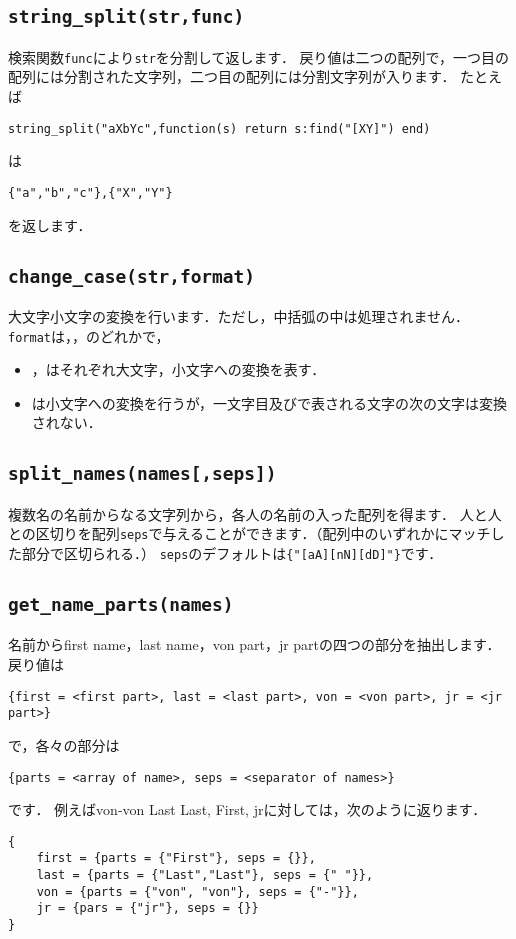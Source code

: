 \documentclass[a4paper]{ltjsarticle}
\newcommand{\luafunc}[1]{\texttt{#1}}
\newcommand*{\luavar}[1]{\texttt{#1}}
\begin{document}
\subsection{\luafunc{string\_split(str,func)}}
検索関数\luavar{func}により\luavar{str}を分割して返します．
戻り値は二つの配列で，一つ目の配列には分割された文字列，二つ目の配列には分割文字列が入ります．
たとえば
\begin{lstlisting}
string_split("aXbYc",function(s) return s:find("[XY]") end)
\end{lstlisting}
は
\begin{lstlisting}
{"a","b","c"},{"X","Y"}
\end{lstlisting}
を返します．


\subsection{\luafunc{change\_case(str,format)}}
大文字小文字の変換を行います．ただし，中括弧の中は処理されません．
\luavar{format}は，，のどれかで，
\begin{itemize}
\item {}，はそれぞれ大文字，小文字への変換を表す．
\item {}は小文字への変換を行うが，一文字目及び\luastring{: *}で表される文字の次の文字は変換されない．
\end{itemize}


\subsection{\luafunc{split\_names(names[,seps])}}
複数名の名前からなる文字列から，各人の名前の入った配列を得ます．
人と人との区切りを配列\luavar{seps}で与えることができます．（配列中のいずれかにマッチした部分で区切られる．）
\luavar{seps}のデフォルトは\verb|{"[aA][nN][dD]"}|です．

\subsection{\luafunc{get\_name\_parts(names)}}
名前からfirst name，last name，von part，jr partの四つの部分を抽出します．
戻り値は
\begin{lstlisting}
{first = <first part>, last = <last part>, von = <von part>, jr = <jr part>}
\end{lstlisting}
で，各々の部分は
\begin{lstlisting}
{parts = <array of name>, seps = <separator of names>}
\end{lstlisting}
です．%
例えばvon-von Last Last, First, jrに対しては，次のように返ります．
\begin{lstlisting}
{
	first = {parts = {"First"}, seps = {}},
	last = {parts = {"Last","Last"}, seps = {" "}},
	von = {parts = {"von", "von"}, seps = {"-"}},
	jr = {pars = {"jr"}, seps = {}}
}
\end{lstlisting}
\end{document}
